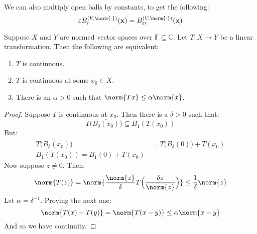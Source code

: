 \documentclass[crop=false,class=article,oneside]{standalone}
\begin{document}
        We can also multiply open balls by constants, to get
        the following:
        \begin{equation}
            \varepsilon{B}_{r}^{(V,\norm{\cdot})}(\mathbf{x})=
            B_{\varepsilon{r}}^{(V,\norm{\cdot})}(\mathbf{x})
        \end{equation}
        \begin{theorem}
            Suppose $X$ and $Y$ are normed vector spaces over
            $\mathbb{F}\subseteq\mathbb{C}$. Let $T:X\rightarrow{Y}$
            be a linear transformation. Then the following
            are equivalent:
            \begin{enumerate}
                \item $T$ is continuous.
                \item $T$ is continuous at some $x_{0}\in{X}$.
                \item There is an $\alpha>0$ such that
                      $\norm{Tx}\leq\alpha\norm{x}$.
            \end{enumerate}
        \end{theorem}
        \begin{proof}
            Suppose $T$ is continuous at $x_{0}$. Then there is a
            $\delta>0$ such that:
            \begin{equation}
                T\Big(\overline{B_{\delta}(x_{0})}\big)
                \subseteq{B}_{1}(T(x_{0}))
            \end{equation}
            But:
            \begin{align}
                T\Big(\overline{B_{\delta}(x_{0})}\big)
                &=T\Big(\overline{B_{\delta}(0)}\big)+T(x_{0})\\
                B_{1}(T(x_{0}))=
                B_{1}(0)+T(x_{0})
            \end{align}
            Now suppose $z\ne{0}$. Then:
            \begin{equation}
                \norm{T(z)}=
                \norm{\frac{\norm{z}}{\delta}
                      T\Big(\frac{\delta{z}}{\norm{z}}\Big)}
                \leq\frac{1}{\delta}\norm{z}
            \end{equation}
            Let $\alpha=\delta^{\minus{1}}$.
            Proving the next one:
            \begin{equation}
                \norm{T(x)-T(y)}=\norm{T(x-y)}
                \leq\alpha\norm{x-y}
            \end{equation}
            And so we have continuity.
        \end{proof}
\end{document}
